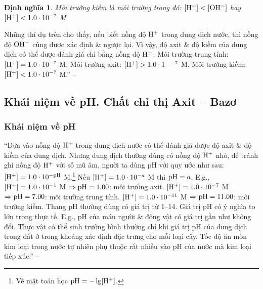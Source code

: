 \documentclass[oneside]{book}
\numberwithin{equation}{section}
\newtheorem{dinhnghia}{Định nghĩa}[section]
\begin{document}
\begin{dinhnghia}
	\emph{Môi trường kiềm} là môi trường trong đó: $\rm[H^+] < [OH^-]$ hay $\rm[H^+] < 1.0\cdot 10^{-7}$ M.
\end{dinhnghia}
Những thí dụ trên cho thấy, nếu biết nồng độ $\rm H^+$ trong dung dịch nước, thì nồng độ $\rm OH^-$ cũng được xác định \& ngược lại. Vì vậy, độ axit \& độ kiềm của dung dịch có thể được đánh giá chỉ bằng nồng độ $\rm H^+$. Môi trường trung tính: $\rm[H^+] = 1.0\cdot 10^{-7}$ M. Môi trường axit: $\rm[H^+] > 1.0\cdot 1-^{-7}$ M. Môi trường kiềm: $\rm[H^+] < 1.0\cdot 10^{-7}$ M.'' -- \cite[p. 18]{SGK_Hoa_Hoc_11_nang_cao}

\subsection{Khái niệm về pH. Chất chỉ thị Axit -- Bazơ}

\subsubsection{Khái niệm về pH}
``Dựa vào nồng độ $\rm H^+$ trong dung dịch nước có thể đánh giá được độ axit \& độ kiềm của dung dịch. Nhưng dung dịch thường dùng có nồng độ $\rm H^+$ nhỏ, để tránh ghi nồng độ $\rm H^+$ với số mũ âm, người ta dùng pH với quy ước như sau: $\rm[H^+] = 1.0\cdot 10^{-pH}$ M.\footnote{Về mặt toán học $\rm pH = -\lg[H^+]$.} Nếu $[{\rm H}^+] = 1.0\cdot 10^{-a}$ M thì ${\rm pH} = a$. E.g., $\rm[H^+] = 1.0\cdot 10^{-1}$ M $\Rightarrow\rm pH = 1.00$: môi trường axit. $\rm[H^+] = 1.0\cdot 10^{-7}$ M $\Rightarrow\rm pH = 7.00$: môi trường trung tính. $\rm[H^+] = 1.0\cdot 10^{-11}$ M $\Rightarrow\rm pH = 11.00$: môi trường kiềm. Thang pH thường dùng có giá trị từ 1--14. Giá trị pH có ý nghĩa to lớn trong thực tế. E.g., pH của máu người \& động vật có giá trị gần như không đổi. Thực vật có thể sinh trưởng bình thường chỉ khi giá trị pH của dung dịch trong đất ở trong khoảng xác định đặc trưng cho mỗi loại cây. Tốc độ ăn mòn kim loại trong nước tự nhiên phụ thuộc rất nhiều vào pH của nước mà kim loại tiếp xúc.'' -- \cite[pp. 18--19]{SGK_Hoa_Hoc_11_nang_cao}
\end{document}
